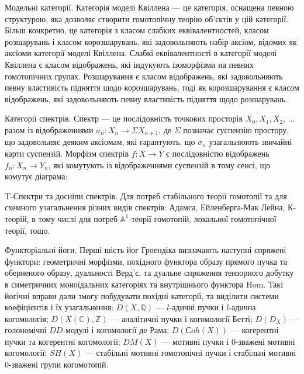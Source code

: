 Модельні категорії. Категорія моделі Квіллена --- це категорія,
оснащена певною структурою, яка дозволяє створити гомотопічну
теорію об'єктів у цій категорії. Більш конкретно, це категорія
з класом слабких еквівалентностей, класом розшарувань і класом
корозшарувань, які задовольняють набір аксіом, відомих як аксіоми
категорії моделі Квіллена. Слабкі еквівалентності в категорії моделі
Квіллена є класом відображень, які індукують ізоморфізми на певних
гомотопічних групах. Розшарування є класом відображень, які
задовольняють певну властивість підняття щодо корозшарувань,
тоді як корозшарування є класом відображень, які задовольняють
певну властивість підняття щодо розшарувань.

Категорії спектрів. Спектр --- це послідовність точкових
просторів $X_0, X_1, X_2$, ... разом із відображеннями $\sigma_n : X_n \rightarrow \Sigma X_{n+1}$,
де $\Sigma$ позначає суспензію простору, що задовольняє деяким аксіомам,
які гарантують, що $\sigma_n$ узагальнюють звичайні карти
суспензій. Морфізм спектрів $f: X \rightarrow Y$ є послідовністю
відображень $f_n : X_n \rightarrow Y_n$, які комутують із
відображеннями суспензій в тому сенсі, що комутує діаграма:

\newpage
\begin{center}
\end{center}

T-Спектри та досніпи спектрів. Для потреб стабільного теорії
гомотопії та для схемного узагальнення різних видів спектрів:
Адамса, Ейленберга-Мак Лейна, К-теорій, в тому числі для потреб
$\mathbb{A}^1$-теорії гомотопій, локальної гомотопічної теорії, тощо.

Функторіальні йоги. Перші шість йог Гроендіка визначають наступні
спряжені функтори: геометричні морфізми, похідного функтора образу
прямого пучка та оберненого образу, дуальності Верд'є, та дуальне
спряження тензорного добутку в симетричних моноїдальних категоріях
та внутрішнього функтора Hom. Такі йогічні вправи дали змогу
побудувати похідні категорії, та виділити системи коефіцієнтів
і їх узагальнення: $D(X,\mathbb{Q})$ --- $l$-адичні пучки і $l$-адична
когомологія; $D(X(\mathbb{C}),\mathbb{Z})$ --- аналітичні
пучки і когомології Бетті; $D(\mathit{D}_X)$ --- голономічні $D\mathit{D}$-модулі
і когомології де Рама; $D(Сoh(X))$ --- когерентні пучки
та когерентні когомології; $DM(X)$ --- мотивні пучки і
0-зважені мотивні когомології; $SH(X)$ --- стабільні мотивні
гомотопічні пучки і стабільні мотивні 0-зважені групи когомотопій.

